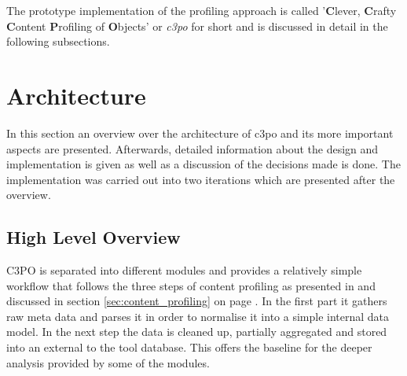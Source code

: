 
The prototype implementation of the profiling approach is called '\textbf{C}lever, \textbf{C}rafty \textbf{C}ontent \textbf{P}rofiling of \textbf{O}bjects' or \textit{c3po} for short and is discussed in detail in the following subsections.

\section{Architecture}
In this section an overview over the architecture of c3po and its more important aspects are presented. Afterwards, detailed information about the design and implementation is given as well as a discussion of the decisions made is done. The implementation was carried out into two iterations which are presented after the overview.

\subsection{High Level Overview}
C3PO is separated into different modules and provides a relatively simple workflow that follows the three steps of content profiling as presented in \cite{petrov-ipres2012} and discussed in section \ref{sec:content_profiling} on page \pageref{sec:content_profiling}. In the first part it gathers raw meta data and parses it in order to normalise it into a simple internal data model. In the next step the data is cleaned up, partially aggregated and stored into an external to the tool database.
This offers the baseline for the deeper analysis provided by some of the modules.


